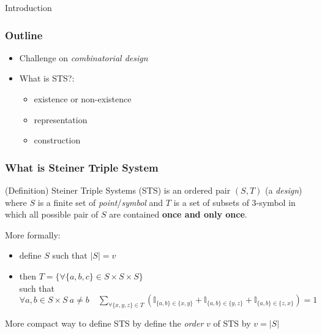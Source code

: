 	\begin{frame}[plain,c]
		\begin{center}
			\huge Introduction
		\end{center}
	\end{frame}


	\begin{frame}
		\frametitle{Outline}
		\begin{itemize}
			\item Challenge on \textit{combinatorial design}%
			\item What is STS?:
			\begin{itemize}
				\item existence or non-existence
				\item representation
				\item construction
			\end{itemize}
		\end{itemize}
	\end{frame}

	\begin{frame}
		\frametitle{What is Steiner Triple System }
		\begin{block}{(Definition) Steiner Triple Systems (STS)}
			is an ordered pair $(S,T)$ (a \textit{design}) where $S$ is a finite set of \textit{point}/\textit{symbol} and $T$ is a set of subsets of 3-symbol in which all possible pair of $S$ are contained \textbf{once and only once}.\\
			 
		\end{block}
	
	\pause
	
	More formally:\\
	\begin{itemize}
		\item define $S$ such that $|S|=v$
		\item 	then $T = \{ \forall \{a,b,c\} \in S\times S \times S\}$\\
		 such that $\forall a,b \in S \times S \ a \not = b  \quad \sum_{ \forall \{x,y,z\} \in T} (\mathbb{I}_{ \{ a,b \} \in \{x,y\} }  + \mathbb{I}_{ \{ a,b \} \in \{y,z\} } +\mathbb{I}_{ \{ a,b \} \in \{z,x\}  }) = 1 $
	\end{itemize}
	More compact way to define STS by define the \textit{order} $v$ of STS by $v = |S|$
	\end{frame}

